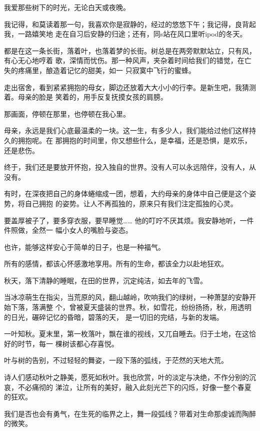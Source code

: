 \documentclass[12pt,a4paper]{article}
\begin{document}
		我爱那些树下的时光，无论白天或夜晚。

		我记得，和莫读着那一句，我喜欢你是寂静的，经过的悠悠下午；我记得，良背起我，一路嬉笑地
	走在自习后安静的归途；还有，同s站在风口里听ipod的冬天。

		都是在这一条长街，落着叶，也落着梦的长街。树总是在两旁默默站立，只有风，有心无心地哼着
	歌，深情而忧伤。那一种风声，夹杂着时间给我们的错觉，在亡失的疼痛里，酿造着记忆的甜美，如一
	只寂寞中飞行的蜜蜂。

		走出宿舍，看到紧紧拥抱的母女，脚边还放着大大小小的行李。是新生吧，我猜测着。母亲的脸是
	笑着的，用手反复抚摸女孩的肩膀。

		那画面，停顿在那里，也停顿在我心里。

		母亲，永远是我们心底最温柔的一块。这一生，有多少人，我们能给过他们这样持久的拥抱呢。在
	那拥抱的时间里，你又想些什么，是幸福，还是恐惧，是欢乐，还是悲伤。

		终于，我们还是要放开怀抱，投入独自的世界。没有人可以永远陪伴，没有人，从没有。

		有时，在深夜把自己的身体蜷缩成一团，想着，大约母亲的身体中自己便是这个姿势，将自己拥抱
	的姿势。让人不再孤独的，原来只有我们注定孤独的心灵。

		要盖厚被子了，要多穿衣服，要早睡觉…… 他的叮咛不厌其烦。我安静地听，一件件照做，全然一
	幅小女人的嘴脸与姿态。

		也许，能够这样安心于简单的日子，也是一种福气。

		所有的感情，都该心怀感激地享用。所有的生命，都该全力以赴地狂欢。

		秋天，落下清静的睡眠，在田的世界，沉定纯洁，如去年的飞雪。

	\endwriting



		当冰凉萌生在指尖，当荒原的风，翻山越岭，吹响我们的绿树，一种萧瑟的安静开始下落，落满整
	个，曾被夏天盛装的世界。秋，如雪花，纷纷扬扬，秋，用透明的日光，碾碎记忆的昏暗，碧落的天，
	是一切旧的完结，与新的发端。

		一叶知秋。夏末里，第一枚落叶，飘在谁的视线，又兀自睡去。归于土地，在这恰好的时节，每一
	棵树该都心存喜悦。

		叶与树的告别，不过轻轻的舞姿，一段下落的弧线，于茫然的天地大荒。

		诗人们感动秋叶之静美，愿死如秋叶。我也欣赏，叶的淡定与决绝，不作分别的沉哀，不必痛彻的
	涕泣，让所有的美好，融入此刻光芒下的闪烁，好像一整个春夏的狂欢。

		我们是否也会有勇气，在生死的临界之上，舞一段弧线？带着对生命那虔诚而陶醉的微笑。
\end{document}

